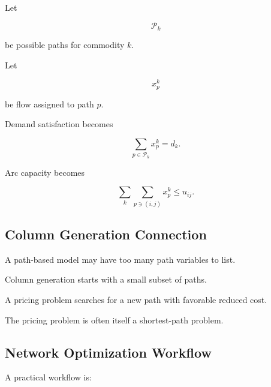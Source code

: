 Let

\[
\mathcal{P}_k
\]

be possible paths for commodity \(k\).

Let

\[
x_p^k
\]

be flow assigned to path \(p\).

Demand satisfaction becomes

\[
\boxed{
\sum_{p\in\mathcal{P}_k}
x_p^k
=
d_k.
}
\]

Arc capacity becomes

\[
\boxed{
\sum_k
\sum_{p\ni(i,j)}
x_p^k
\leq
u_{ij}.
}
\]

\subsection{Column Generation Connection}
\label{subsec:network-column-generation}

A path-based model may have too many path variables to list.

Column generation starts with a small subset of paths.

A pricing problem searches for a new path with favorable reduced cost.

The pricing problem is often itself a shortest-path problem.

\subsection{Network Optimization Workflow}
\label{subsec:network-optimization-workflow}

A practical workflow is:


